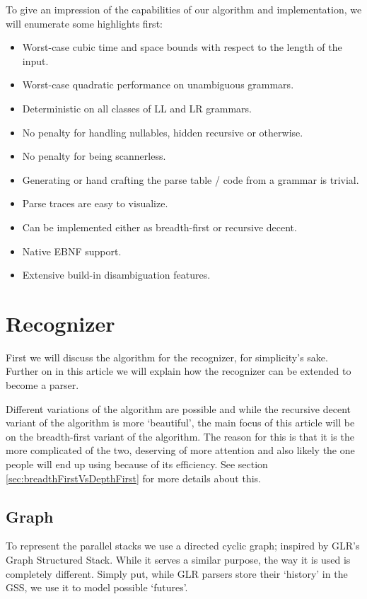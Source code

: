 \documentclass[a4paper,10pt]{article}
\begin{document}
To give an impression of the capabilities of our algorithm and implementation, we will enumerate some highlights first:
\begin{itemize}
 \setlength{\itemsep}{0pt}
 \setlength{\parskip}{0pt}
 \setlength{\parsep}{0pt}
 
 \item Worst-case cubic time and space bounds with respect to the length of the input.
 \item Worst-case quadratic performance on unambiguous grammars.
 \item Deterministic on all classes of LL and LR grammars.
 \item No penalty for handling nullables, hidden recursive or otherwise.
 \item No penalty for being scannerless.
 \item Generating or hand crafting the parse table / code from a grammar is trivial.
 \item Parse traces are easy to visualize.
 \item Can be implemented either as breadth-first or recursive decent.
 \item Native EBNF support.
 \item Extensive build-in disambiguation features.
\end{itemize}

\pagebreak
\section{Recognizer}

First we will discuss the algorithm for the recognizer, for simplicity's sake. Further on in this article we will explain how the recognizer can be extended to become a parser.

Different variations of the algorithm are possible and while the recursive decent variant of the algorithm is more `beautiful', the main focus of this article will be on the breadth-first variant of the algorithm. The reason for this is that it is the more complicated of the two, deserving of more attention and also likely the one people will end up using because of its efficiency. See section \ref{sec:breadthFirstVsDepthFirst} for more details about this.

\subsection{Graph}

To represent the parallel stacks we use a directed cyclic graph; inspired by GLR's Graph Structured Stack. While it serves a similar purpose, the way it is used is completely different. Simply put, while GLR parsers store their `history' in the GSS, we use it to model possible `futures'.
\end{document}
